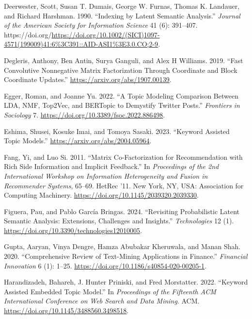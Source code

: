 \documentclass[
]{article}
\newlength{\cslhangindent}
\newlength{\cslentryspacingunit} %
\newenvironment{CSLReferences}[2] %
 {%
  \setlength{\parindent}{0pt}
  \ifodd #1
  \let\oldpar\par
  \def\par{\hangindent=\cslhangindent\oldpar}
  \fi
  \setlength{\parskip}{#2\cslentryspacingunit}
 }%
 {}
\begin{document}
\begin{CSLReferences}{1}{0}
\leavevmode{}%
Deerwester, Scott, Susan T. Dumais, George W. Furnas, Thomas K. Landauer, and Richard Harshman. 1990. {``Indexing by Latent Semantic Analysis.''} \emph{Journal of the American Society for Information Science} 41 (6): 391--407. https://doi.org/\url{https://doi.org/10.1002/(SICI)1097-4571(199009)41:6\%3C391::AID-ASI1\%3E3.0.CO;2-9}.

\leavevmode{}%
Degleris, Anthony, Ben Antin, Surya Ganguli, and Alex H Williams. 2019. {``Fast Convolutive Nonnegative Matrix Factorization Through Coordinate and Block Coordinate Updates.''} \url{https://arxiv.org/abs/1907.00139}.

\leavevmode{}%
Egger, Roman, and Joanne Yu. 2022. {``A Topic Modeling Comparison Between LDA, NMF, Top2Vec, and BERTopic to Demystify Twitter Posts.''} \emph{Frontiers in Sociology} 7. \url{https://doi.org/10.3389/fsoc.2022.886498}.

\leavevmode{}%
Eshima, Shusei, Kosuke Imai, and Tomoya Sasaki. 2023. {``Keyword Assisted Topic Models.''} \url{https://arxiv.org/abs/2004.05964}.

\leavevmode{}%
Fang, Yi, and Luo Si. 2011. {``Matrix Co-Factorization for Recommendation with Rich Side Information and Implicit Feedback.''} In \emph{Proceedings of the 2nd International Workshop on Information Heterogeneity and Fusion in Recommender Systems}, 65--69. HetRec '11. New York, NY, USA: Association for Computing Machinery. \url{https://doi.org/10.1145/2039320.2039330}.

\leavevmode{}%
Figuera, Pau, and Pablo García Bringas. 2024. {``Revisiting Probabilistic Latent Semantic Analysis: Extensions, Challenges and Insights.''} \emph{Technologies} 12 (1). \url{https://doi.org/10.3390/technologies12010005}.

\leavevmode{}%
Gupta, Aaryan, Vinya Dengre, Hamza Abubakar Kheruwala, and Manan Shah. 2020. {``Comprehensive Review of Text-Mining Applications in Finance.''} \emph{Financial Innovation} 6 (1): 1--25. \url{https://doi.org/10.1186/s40854-020-00205-1}.

\leavevmode{}%
Harandizadeh, Bahareh, J. Hunter Priniski, and Fred Morstatter. 2022. {``Keyword Assisted Embedded Topic Model.''} In \emph{Proceedings of the Fifteenth {ACM} International Conference on Web Search and Data Mining}. {ACM}. \url{https://doi.org/10.1145/3488560.3498518}.


\end{CSLReferences}
\end{document}
